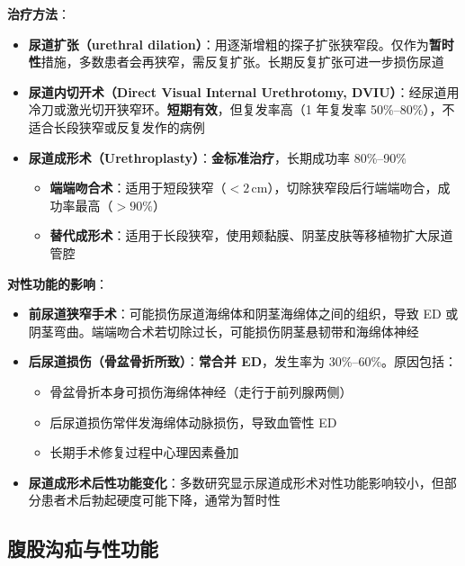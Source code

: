 \documentclass[12pt,a4paper,twoside]{ctexbook}
\begin{document}
\vspace{0.5em}
\noindent\textbf{治疗方法}：

\begin{itemize}[leftmargin=2cm]
	\item \textbf{尿道扩张（urethral dilation）}：用逐渐增粗的探子扩张狭窄段。仅作为\textbf{暂时性}措施，多数患者会再狭窄，需反复扩张。长期反复扩张可进一步损伤尿道
	\item \textbf{尿道内切开术（Direct Visual Internal Urethrotomy, DVIU）}：经尿道用冷刀或激光切开狭窄环。\textbf{短期有效}，但复发率高（1 年复发率 50\%--80\%），不适合长段狭窄或反复发作的病例
	\item \textbf{尿道成形术（Urethroplasty）}：\textbf{金标准治疗}，长期成功率 80\%--90\%
	\begin{itemize}
		\item \textbf{端端吻合术}：适用于短段狭窄（$<2\,$cm），切除狭窄段后行端端吻合，成功率最高（$>90\%$）
		\item \textbf{替代成形术}：适用于长段狭窄，使用颊黏膜、阴茎皮肤等移植物扩大尿道管腔
	\end{itemize}
\end{itemize}

\vspace{0.5em}
\noindent\textbf{对性功能的影响}：

\begin{itemize}[leftmargin=2cm]
	\item \textbf{前尿道狭窄手术}：可能损伤尿道海绵体和阴茎海绵体之间的组织，导致 ED 或阴茎弯曲。端端吻合术若切除过长，可能损伤阴茎悬韧带和海绵体神经
	\item \textbf{后尿道损伤（骨盆骨折所致）}：\textbf{常合并 ED}，发生率为 30\%--60\%。原因包括：
	\begin{itemize}
		\item 骨盆骨折本身可损伤海绵体神经（走行于前列腺两侧）
		\item 后尿道损伤常伴发海绵体动脉损伤，导致血管性 ED
		\item 长期手术修复过程中心理因素叠加
	\end{itemize}
	\item \textbf{尿道成形术后性功能变化}：多数研究显示尿道成形术对性功能影响较小，但部分患者术后勃起硬度可能下降，通常为暂时性
\end{itemize}

\subsection{腹股沟疝与性功能}
\label{subsec:inguinal_hernia_sex}
\end{document}
